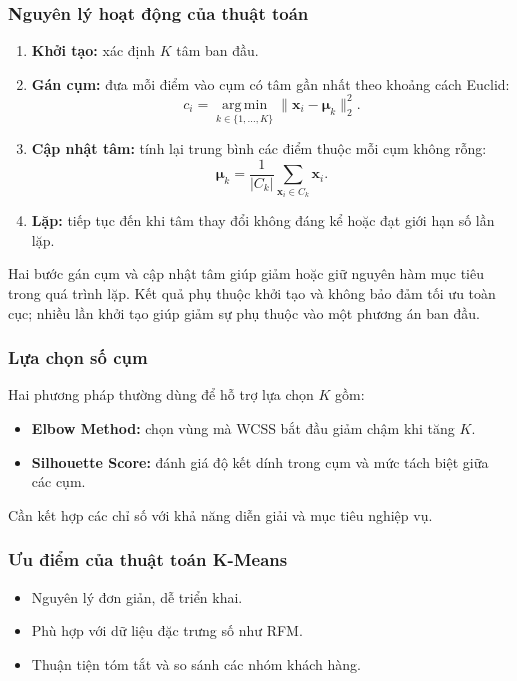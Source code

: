 \documentclass[a4paper]{article}
\begin{document}
\subsubsection{Nguyên lý hoạt động của thuật toán}
\begin{enumerate}
    \item \textbf{Khởi tạo:} xác định $K$ tâm ban đầu.
    \item \textbf{Gán cụm:} đưa mỗi điểm vào cụm có tâm gần nhất theo khoảng cách Euclid:
    \[
    c_i=\underset{k\in\{1,\ldots,K\}}{\operatorname{arg\,min}}
    \|\mathbf{x}_i-\boldsymbol{\mu}_k\|_2^2.
    \]
    \item \textbf{Cập nhật tâm:} tính lại trung bình các điểm thuộc mỗi cụm không rỗng:
    \[
    \boldsymbol{\mu}_k=\frac{1}{|C_k|}\sum_{\mathbf{x}_i\in C_k}\mathbf{x}_i.
    \]
    \item \textbf{Lặp:} tiếp tục đến khi tâm thay đổi không đáng kể hoặc đạt giới hạn số lần lặp.
\end{enumerate}
Hai bước gán cụm và cập nhật tâm giúp giảm hoặc giữ nguyên hàm mục tiêu trong quá trình lặp. Kết quả phụ thuộc khởi tạo và không bảo đảm tối ưu toàn cục; nhiều lần khởi tạo giúp giảm sự phụ thuộc vào một phương án ban đầu.

\subsubsection{Lựa chọn số cụm}
Hai phương pháp thường dùng để hỗ trợ lựa chọn $K$ gồm:
\begin{itemize}
    \item \textbf{Elbow Method:} chọn vùng mà WCSS bắt đầu giảm chậm khi tăng $K$.
    \item \textbf{Silhouette Score:} đánh giá độ kết dính trong cụm và mức tách biệt giữa các cụm.
\end{itemize}
Cần kết hợp các chỉ số với khả năng diễn giải và mục tiêu nghiệp vụ.

\subsubsection{Ưu điểm của thuật toán K-Means}
\begin{itemize}
    \item Nguyên lý đơn giản, dễ triển khai.
    \item Phù hợp với dữ liệu đặc trưng số như RFM.
    \item Thuận tiện tóm tắt và so sánh các nhóm khách hàng.
\end{itemize}
\end{document}
